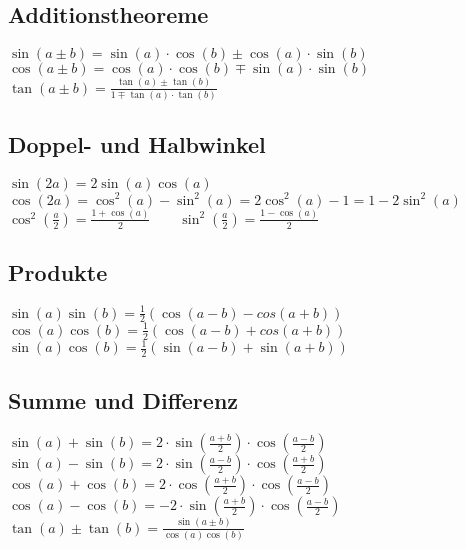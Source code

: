\begin{minipage}{12.5cm}
  \subsection{Additionstheoreme}
    $\sin(a \pm b)=\sin(a) \cdot \cos(b) \pm \cos(a) \cdot \sin(b)$\\
    $\cos(a \pm b)=\cos(a) \cdot \cos(b) \mp \sin(a) \cdot \sin(b)$\\ 
    $\tan(a \pm b)=\frac{\tan(a) \pm \tan(b)}{1 \mp \tan(a) \cdot \tan(b)}$
    
  \subsection{Doppel- und Halbwinkel} 
    $\sin(2a)=2\sin(a)\cos(a)$\\
    $\cos(2a)=\cos^2(a)-\sin^2(a)=2\cos^2(a)-1=1-2\sin^2(a)$\\
    $\cos^2 \left(\frac{a}{2}\right)=\frac{1+\cos(a)}{2} \qquad
    \sin^2 \left(\frac{a}{2}\right)=\frac{1-\cos(a)}{2}$
    
  \subsection{Produkte}
    $\sin(a)\sin(b)=\frac{1}{2}(\cos(a-b)-cos(a+b))$\\
    $\cos(a)\cos(b)=\frac{1}{2}(\cos(a-b)+cos(a+b))$\\
    $\sin(a)\cos(b)=\frac{1}{2}(\sin(a-b)+\sin(a+b))$
    
  \subsection{Summe und Differenz}
    $\sin(a)+\sin(b)=2 \cdot \sin \left(\frac{a+b}{2}\right) \cdot
    \cos\left(\frac{a-b}{2}\right)$\\
    $\sin(a)-\sin(b)=2 \cdot \sin \left(\frac{a-b}{2}\right) \cdot
    \cos\left(\frac{a+b}{2}\right)$\\
    $\cos(a)+\cos(b)=2 \cdot \cos \left(\frac{a+b}{2}\right) \cdot
    \cos\left(\frac{a-b}{2}\right)$\\
    $\cos(a)-\cos(b)=-2 \cdot \sin \left(\frac{a+b}{2}\right) \cdot
    \cos\left(\frac{a-b}{2}\right)$\\
    $\tan(a) \pm \tan(b)=\frac{\sin(a \pm b)}{\cos(a)\cos(b)}$      
\end{minipage}

